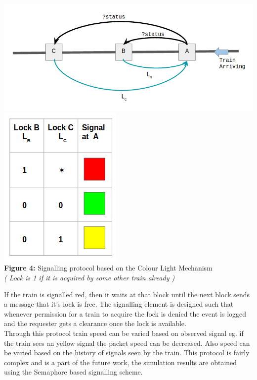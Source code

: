 \documentclass[twoside,11pt]{article}
\begin{document}
\begin{center}
	\includegraphics[scale=0.5]{img/signalling.png} \\
	\includegraphics[scale=0.5]{img/signalling-chart.png} \\
	{\bf Figure 4:} Signalling protocol based on the Colour Light Mechanism  \\
	{\em ( Lock is 1 if it is acquired by some other train already )}
	
\end{center}

If the train is signalled red, then it waits at that block until
the next block sends a message that it's lock is free. The signalling element is 
designed such that whenever permission for a train to acquire the lock is denied the
event is logged and the requester gets a clearance once the lock is available. \\

	Through this protocol train speed can be varied based on observed signal eg. if the train sees an yellow signal the packet speed can be decreased. Also speed can be varied based on the history of signals seen by the train. This protocol is fairly complex and is a part of the future work, the simulation results are obtained using the Semaphore based signalling scheme.
 
\end{document}
